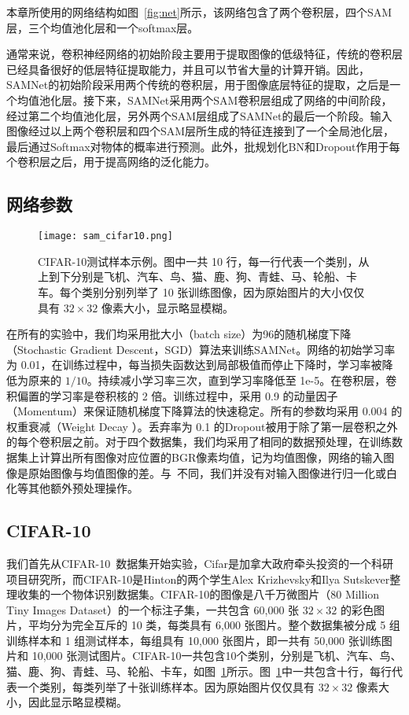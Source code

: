 本章所使用的网络结构如图~\ref{fig:net}所示，该网络包含了两个卷积层，四个SAM层，三个均值池化层和一个softmax层。

通常来说，卷积神经网络的初始阶段主要用于提取图像的低级特征，传统的卷积层已经具备很好的低层特征提取能力，并且可以节省大量的计算开销。因此，SAMNet的初始阶段采用两个传统的卷积层，用于图像底层特征的提取，之后是一个均值池化层。接下来，SAMNet采用两个SAM卷积层组成了网络的中间阶段，经过第二个均值池化层，另外两个SAM层组成了SAMNet的最后一个阶段。输入图像经过以上两个卷积层和四个SAM层所生成的特征连接到了一个全局池化层，最后通过Softmax对物体的概率进行预测。此外，批规划化BN和Dropout作用于每个卷积层之后，用于提高网络的泛化能力。

\subsection{网络参数}
\label{sec:sap:experiment:param}

\begin{figure}[!h]
\centering
\texttt{[image: sam\_cifar10.png]}
\caption{CIFAR-10测试样本示例。图中一共 10 行，每一行代表一个类别，从上到下分别是飞机、汽车、鸟、猫、鹿、狗、青蛙、马、轮船、卡车。每个类别分别列举了 10 张训练图像，因为原始图片的大小仅仅具有 $32\times32$ 像素大小，显示略显模糊。}
\label{fig:sam_cifar10}
\end{figure}


在所有的实验中，我们均采用批大小（batch size）为96的随机梯度下降（Stochastic Gradient Descent，SGD）算法来训练SAMNet。网络的初始学习率为 0.01，在训练过程中，每当损失函数达到局部极值而停止下降时，学习率被降低为原来的 $1/10$。持续减小学习率三次，直到学习率降低至 1e-5。在卷积层，卷积偏置的学习率是卷积核的 2 倍。训练过程中，采用 0.9 的动量因子（Momentum）来保证随机梯度下降算法的快速稳定。所有的参数均采用 0.004 的权重衰减（Weight Decay ）。丢弃率为 0.1 的Dropout被用于除了第一层卷积之外的每个卷积层之前。对于四个数据集，我们均采用了相同的数据预处理，在训练数据集上计算出所有图像对应位置的BGR像素均值，记为均值图像，网络的输入图像是原始图像与均值图像的差。与~\cite{goodfellow2013maxout}不同，我们并没有对输入图像进行归一化或白化等其他额外预处理操作。

\subsection{CIFAR-10}
\label{sec:sap:experiment:cifar10}

我们首先从CIFAR-10~\cite{krizhevsky2009learning}数据集开始实验，Cifar是加拿大政府牵头投资的一个科研项目研究所，而CIFAR-10是Hinton的两个学生Alex Krizhevsky和Ilya Sutskever整理收集的一个物体识别数据集。CIFAR-10的图像是八千万微图片（80 Million Tiny Images Dataset）的一个标注子集，一共包含 60,000 张 $32\times32$ 的彩色图片，平均分为完全互斥的 10 类，每类具有 6,000 张图片。整个数据集被分成 5 组训练样本和 1 组测试样本，每组具有 10,000 张图片，即一共有 50,000 张训练图片和 10,000 张测试图片。CIFAR-10一共包含10个类别，分别是飞机、汽车、鸟、猫、鹿、狗、青蛙、马、轮船、卡车，如图~\ref{fig:sam_cifar10}所示。图~\ref{fig:sam_cifar10}中一共包含十行，每行代表一个类别，每类列举了十张训练样本。因为原始图片仅仅具有 $32\times32$ 像素大小，因此显示略显模糊。

